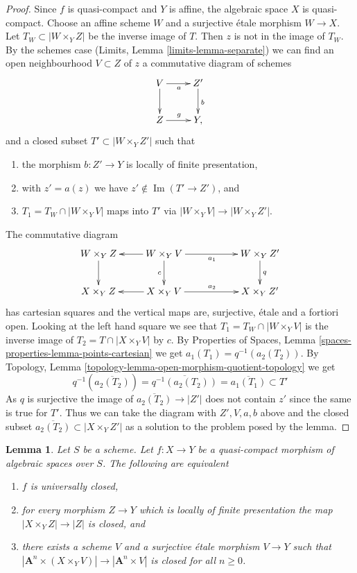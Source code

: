 \documentclass{stacks-project}
\theoremstyle{plain}
\newtheorem{lemma}[subsection]{Lemma}
\theoremstyle{definition}
\theoremstyle{remark}
\numberwithin{equation}{subsection}
\def\Im{\mathop{\mathrm{Im}}}
\begin{document}
\begin{proof}
\medskip\noindent
Since $f$ is quasi-compact and $Y$ is affine, the algebraic space
$X$ is quasi-compact. Choose an affine scheme $W$ and a surjective
\'etale morphism $W \to X$. Let $T_W \subset |W \times_Y Z|$
be the inverse image of $T$. Then $z$ is not in the image of
$T_W$. By the schemes case (Limits, Lemma \ref{limits-lemma-separate})
we can find an open neighbourhood $V \subset Z$ of $z$
a commutative diagram of schemes
$$
\xymatrix{
V \ar[d] \ar[r]_a & Z' \ar[d]^b \\
Z \ar[r]^g & Y,
}
$$
and a closed subset $T' \subset |W \times_Y Z'|$ such that
\begin{enumerate}
\item the morphism $b : Z' \to Y$ is locally of finite presentation,
\item with $z' = a(z)$ we have $z' \not \in \Im(T' \to Z')$, and
\item $T_1 = T_W \cap |W \times_Y V|$ maps into $T'$ via
$|W \times_Y V| \to |W \times_Y Z'|$.
\end{enumerate}
The commutative diagram
$$
\xymatrix{
W \times_Y Z \ar[d] &
W \times_Y V \ar[l] \ar[rr]_{a_1} \ar[d]_c & &
W \times_Y Z' \ar[d]^q \\
X \times_Y Z &
X \times_Y V \ar[l] \ar[rr]^{a_2} & &
X \times_Y Z'
}
$$
has cartesian squares and the vertical maps are, surjective, \'etale
and a fortiori open. Looking at the left hand square we
see that $T_1 = T_W \cap |W \times_Y V|$ is the inverse image of
$T_2 = T \cap |X \times_Y V|$ by $c$. By Properties of Spaces, Lemma
\ref{spaces-properties-lemma-points-cartesian} we get
$a_1(T_1) = q^{-1}(a_2(T_2))$.
By Topology, Lemma \ref{topology-lemma-open-morphism-quotient-topology}
we get
$$
q^{-1}\left(\overline{a_2(T_2)}\right) =
\overline{q^{-1}(a_2(T_2))} =
\overline{a_1(T_1)} \subset T'
$$
As $q$ is surjective the image of $\overline{a_2(T_2)} \to |Z'|$
does not contain $z'$ since the same is true for $T'$.
Thus we can take the diagram with $Z', V, a, b$ above and the
closed subset $\overline{a_2(T_2)} \subset |X \times_Y Z'|$ as
a solution to the problem posed by the lemma.
\end{proof}

\begin{lemma}
\label{lemma-test-universally-closed}
Let $S$ be a scheme.
Let $f : X \to Y$ be a quasi-compact morphism of algebraic spaces over $S$.
The following are equivalent
\begin{enumerate}
\item $f$ is universally closed,
\item for every morphism $Z \to Y$ which is locally of finite presentation
the map $|X \times_Y Z| \to |Z|$ is closed, and
\item there exists a scheme $V$ and a surjective \'etale morphism $V \to Y$
such that $|\mathbf{A}^n \times (X \times_Y V)| \to |\mathbf{A}^n \times V|$
is closed for all $n \geq 0$.
\end{enumerate}
\end{lemma}
\end{document}
